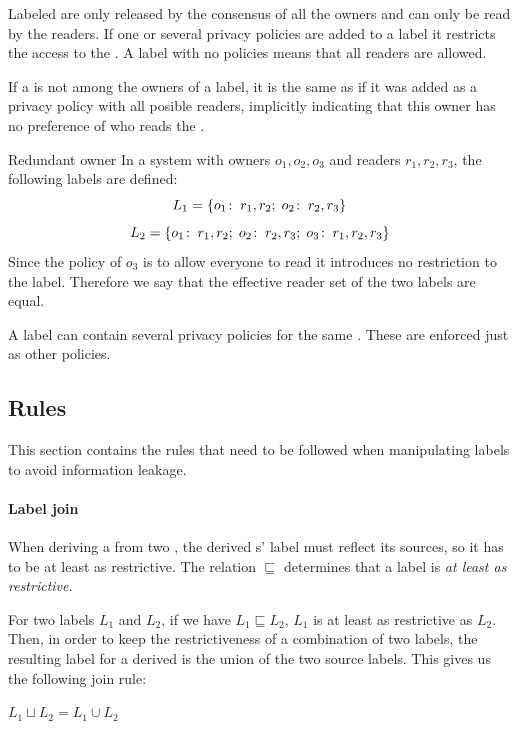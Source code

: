 Labeled \xvalues{} are only released by the consensus of all the owners and can only be read by the readers.
If one or several privacy policies are added to a label it restricts the access to the \xvalue{}.
A label with no policies  means that all readers are allowed.

If a \principal{} is not among the owners of a label, it is the same as if it was added as a privacy policy with all posible readers, implicitly indicating that this owner has no preference of who reads the \xvalue{}.

\begin{example}{Redundant owner}
In a system with owners $o_1, o_2, o_3$ and readers $r_1, r_2, r_3$, the following labels are defined:
$$L_1 = \{o_1\!:\;r_1,r_2;\; o_2\!:\;r_2, r_3\}$$
$$L_2 = \{o_1\!:\;r_1,r_2;\; o_2\!:\;r_2, r_3;\; o_3\!:\;r_1, r_2, r_3\}$$
Since the policy of $o_3$ is to allow everyone to read it introduces no restriction to the label.
Therefore we say that the effective reader set of the two labels are equal.
\end{example}

A label can contain several privacy policies for the same \principal{}.
These are enforced just as other policies.

\subsection{Rules}
This section contains the rules that need to be followed when manipulating labels to avoid information leakage.

\paragraph{Label join}
When deriving a \xvalue{} from two \xvalues{}, the derived \xvalue{}s' label must reflect its sources, so it has to be at least as restrictive.
The relation $\sqsubseteq$ determines that a label is \textit{at least as restrictive}.
\begin{definition}
  For two labels $L_1$ and $L_2$, if we have $L_1 \sqsubseteq L_2$, $L_1$ is at least as restrictive as $L_2$.
  Then, in order to keep the restrictiveness of a combination of two labels, the resulting label for a derived \xvalue{} is the union of the two source labels.
  This gives us the following join rule:
  \begin{center}
    $L_1 \sqcup L_2 = L_1 \cup L_2$
  \end{center}
\end{definition}

